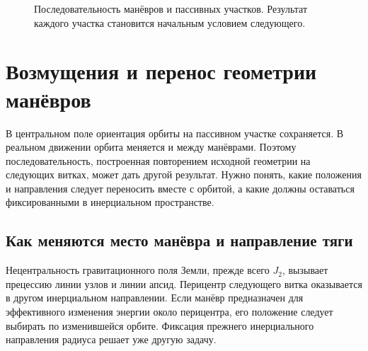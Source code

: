 \documentclass[a4paper,11pt]{article}
\numberwithin{equation}{section}
\begin{document}
\begin{figure}[htbp]
\centering
{}
\caption{Последовательность манёвров и пассивных участков.
Результат каждого участка становится начальным условием следующего.}
\label{fig:timeline}
\end{figure}

\FloatBarrier
\section{Возмущения и перенос геометрии манёвров}
\label{sec:perturbations}

В центральном поле ориентация орбиты на пассивном участке
сохраняется. В реальном движении орбита меняется и между манёврами.
Поэтому последовательность, построенная повторением исходной
геометрии на следующих витках, может дать другой результат.
Нужно понять, какие положения и направления следует переносить
вместе с орбитой, а какие должны оставаться фиксированными
в инерциальном пространстве.

\subsection{Как меняются место манёвра и направление тяги}

Нецентральность гравитационного поля Земли, прежде всего $J_2$,
вызывает прецессию линии узлов и линии апсид.
Перицентр следующего витка оказывается в другом инерциальном
направлении. Если манёвр предназначен для эффективного изменения
энергии около перицентра, его положение следует выбирать
по изменившейся орбите. Фиксация прежнего инерциального
направления радиуса решает уже другую задачу.
\end{document}
